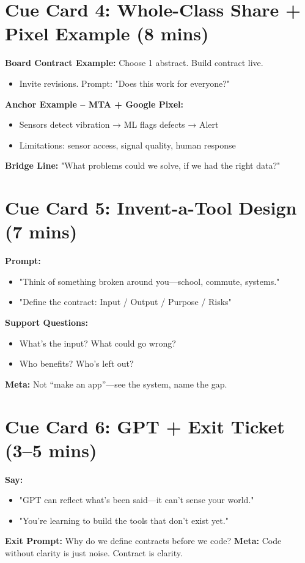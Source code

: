 \documentclass[10pt]{article}
\begin{document}
\section*{Cue Card 4: Whole-Class Share + Pixel Example (8 mins)}
\textbf{Board Contract Example:} Choose 1 abstract. Build contract live.
\begin{itemize}
  \item Invite revisions. Prompt: "Does this work for everyone?"
\end{itemize}
\textbf{Anchor Example – MTA + Google Pixel:}
\begin{itemize}
  \item Sensors detect vibration → ML flags defects → Alert
  \item Limitations: sensor access, signal quality, human response
\end{itemize}
\textbf{Bridge Line:} "What problems could we solve, if we had the right data?"

\section*{Cue Card 5: Invent-a-Tool Design (7 mins)}
\textbf{Prompt:}
\begin{itemize}
  \item "Think of something broken around you—school, commute, systems."
  \item "Define the contract: Input / Output / Purpose / Risks"
\end{itemize}
\textbf{Support Questions:}
\begin{itemize}
  \item What’s the input? What could go wrong?
  \item Who benefits? Who’s left out?
\end{itemize}
\textbf{Meta:} Not “make an app”—see the system, name the gap.

\section*{Cue Card 6: GPT + Exit Ticket (3–5 mins)}
\textbf{Say:}
\begin{itemize}
  \item "GPT can reflect what’s been said—it can’t sense your world."
  \item "You’re learning to build the tools that don’t exist yet."
\end{itemize}
\textbf{Exit Prompt:} Why do we define contracts before we code?
\textbf{Meta:} Code without clarity is just noise. Contract is clarity.
\end{document}
